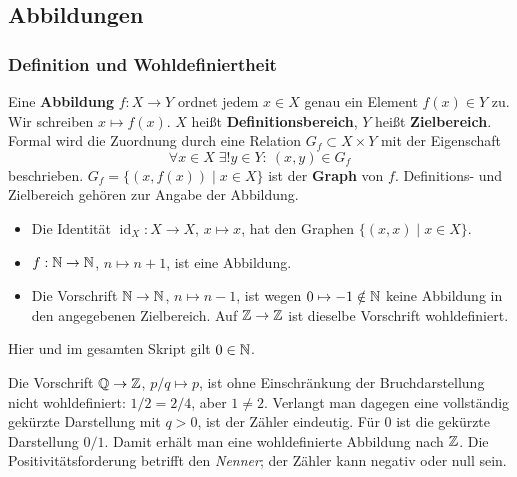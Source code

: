 \subsection{Abbildungen}

\subsubsection*{Definition und Wohldefiniertheit}
\begin{definition}
Eine \textbf{Abbildung} $f:X\to Y$ ordnet jedem $x\in X$ genau ein
Element $f(x)\in Y$ zu. Wir schreiben $x\mapsto f(x)$.
$X$ heißt \textbf{Definitionsbereich}, $Y$ heißt \textbf{Zielbereich}.
Formal wird die Zuordnung durch eine Relation $G_f\subset X\times Y$
mit der Eigenschaft
\[
    \forall x\in X\;\exists!y\in Y:\ (x,y)\in G_f
\]
beschrieben. $G_f=\{(x,f(x))\mid x\in X\}$ ist der \textbf{Graph} von $f$.
Definitions- und Zielbereich gehören zur Angabe der Abbildung.
\end{definition}

\begin{beispiel}
\begin{itemize}
    \item Die Identität $\operatorname{id}_X:X\to X$, $x\mapsto x$,
    hat den Graphen $\{(x,x)\mid x\in X\}$.
    \item $f:\mathbb{N}\to\mathbb{N}$, $n\mapsto n+1$, ist eine Abbildung.
    \item Die Vorschrift $\mathbb{N}\to\mathbb{N}$, $n\mapsto n-1$, ist wegen
    $0\mapsto-1\notin\mathbb{N}$ keine Abbildung in den angegebenen Zielbereich.
    Auf $\mathbb{Z}\to\mathbb{Z}$ ist dieselbe Vorschrift wohldefiniert.
\end{itemize}
Hier und im gesamten Skript gilt $0\in\mathbb{N}$.
\end{beispiel}

\begin{beispiel}
Die Vorschrift $\mathbb{Q}\to\mathbb{Z}$, $p/q\mapsto p$, ist ohne Einschränkung
der Bruchdarstellung nicht wohldefiniert: $1/2=2/4$, aber $1\ne2$.
Verlangt man dagegen eine vollständig gekürzte Darstellung mit
$q>0$, ist der Zähler eindeutig. Für $0$ ist die gekürzte Darstellung
$0/1$. Damit erhält man eine wohldefinierte Abbildung nach $\mathbb{Z}$.
Die Positivitätsforderung betrifft den \emph{Nenner}; der Zähler
kann negativ oder null sein.
\end{beispiel}

